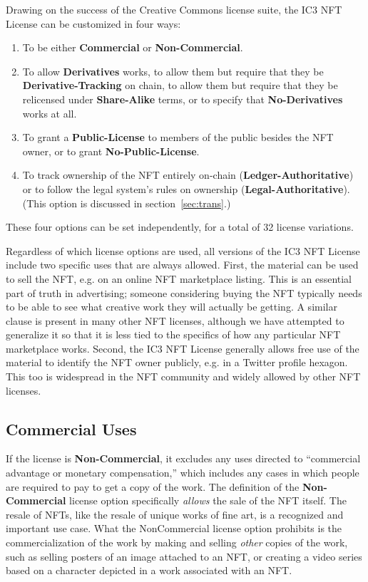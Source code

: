 \documentclass{article}
\newcommand{\iccclicense}{IC3 NFT License\xspace}
\newcommand{\keyword}[1]{\textbf{#1}\xspace}
\newcommand{\publiclicense}{\keyword{Public-License}}
\newcommand{\nopubliclicense}{\keyword{No-Public-License}}
\newcommand{\commercial}{\keyword{Commercial}}
\newcommand{\noncommercial}{\keyword{Non-Commercial}}
\newcommand{\noderivative}{\keyword{No-Derivatives}}
\newcommand{\derivative}{\keyword{Derivatives}}
\newcommand{\sharealike}{\keyword{Share-Alike}}
\newcommand{\derivativetracking}{\keyword{Derivative-Tracking}}
\newcommand{\ledger}{\keyword{Ledger-Authoritative}}
\newcommand{\legal}{\keyword{Legal-Authoritative}}
\begin{document}
Drawing on the success of the Creative Commons license suite, the \iccclicense can be customized in four ways: 
\begin{enumerate}
\item To be either \commercial or \noncommercial.
\item To allow \derivative works, to allow them but require that they be \derivativetracking on chain, to allow them but require that they be relicensed under \sharealike terms, or to specify that \noderivative works at all. 
\item To grant a \publiclicense to members of the public besides the NFT owner, or to grant \nopubliclicense.
\item To track ownership of the NFT entirely on-chain (\ledger) or to follow the legal system's rules on ownership (\legal). (This option is discussed in section~\ref{sec:trans}.)
\end{enumerate} 
These four options can be set independently, for a total of 32 license variations.

Regardless of which license options are used, all versions of the \iccclicense include two specific uses that are always allowed. First, the material can be used to sell the NFT, e.g. on an online NFT marketplace listing. This is an essential part of truth in advertising; someone considering buying the NFT typically needs to be able to see what creative work they will actually be getting. A similar clause is present in many other NFT licenses, although we have attempted to generalize it so that it is less tied to the specifics of how any particular NFT marketplace works. Second, the \iccclicense generally allows free use of the material to identify the NFT owner publicly, e.g. in a Twitter profile hexagon. This too is widespread in the NFT community and widely allowed by other NFT licenses.


\subsection{Commercial Uses}

If the license is \noncommercial, it excludes any uses directed to ``commercial advantage or monetary compensation,'' which includes any cases in which people are required to pay to get a copy of the work.  The definition of the \noncommercial license option specifically \emph{allows} the sale of the NFT itself. The resale of NFTs, like the resale of unique works of fine art, is a recognized and important use case. What the NonCommercial license option prohibits is the commercialization of the work by making and selling \emph{other} copies of the work, such as selling posters of an image attached to an NFT, or creating a video series based on a character depicted in a work associated with an NFT.
\end{document}
